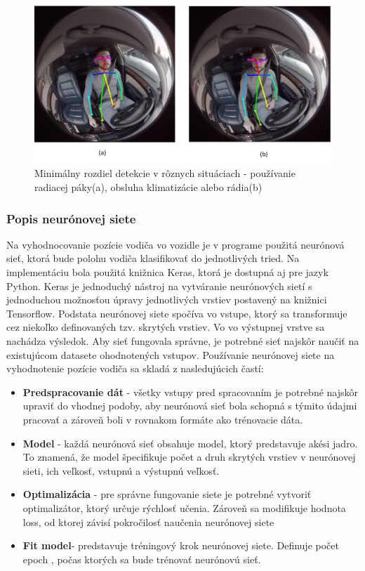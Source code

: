 \documentclass[slovak,master,dept460,male,cpp,cpdeclaration]{diploma}
\begin{document}
\begin{figure}[H]
	\centering
	\includegraphics[width=1\textwidth]{Figures/radioUsage.png}
	\caption{Minimálny rozdiel detekcie v rôznych situáciach - používanie radiacej páky(a), obsluha klimatizácie alebo rádia(b)}
	\label{fig:radioUsage}
\end{figure}


\subsubsection*{Popis neurónovej siete}
Na vyhodnocovanie pozície  vodiča vo vozidle je v programe použitá neurónová sieť, ktorá bude polohu vodiča klasifikovať do jednotlivých tried. Na implementáciu bola použitá knižnica Keras, ktorá je dostupná aj pre jazyk Python. Keras je jednoduchý nástroj na vytváranie neurónových sietí s jednoduchou možnosťou úpravy jednotlivých vrstiev postavený na knižnici Tensorflow. Podstata neurónovej siete spočíva  vo vstupe, ktorý sa transformuje cez niekoľko definovaných tzv. skrytých vrstiev. Vo vo výstupnej vrstve sa nachádza výsledok. Aby  sieť fungovala správne, je potrebné sieť najskôr  naučiť na existujúcom datasete ohodnotených vstupov. Používanie neurónovej siete na vyhodnotenie pozície vodiča sa  skladá z nasledujúcich častí:
\begin{itemize}
\item \textbf{Predspracovanie dát} - všetky vstupy pred spracovaním je potrebné najskôr upraviť do vhodnej podoby, aby neurónová sieť bola schopná s týmito údajmi pracovať a zároveň boli v  rovnakom formáte ako trénovacie dáta. 

\item \textbf{Model} - každá neurónová sieť obsahuje model, ktorý predstavuje akési jadro. To znamená, že model špecifikuje počet a druh skrytých vrstiev v neurónovej sieti, ich veľkosť, vstupnú a výstupnú veľkosť.
\item \textbf{Optimalizácia} - pre správne fungovanie siete je potrebné vytvoriť optimalizátor, ktorý určuje rýchlosť učenia. Zároveň sa modifikuje hodnota loss, od ktorej závisí pokročilosť naučenia neurónovej siete
\item \textbf{Fit model}- predstavuje tréningový krok neurónovej siete. Definuje počet epoch , počas ktorých sa bude trénovať neurónovú sieť.
\end{itemize}
\end{document}
